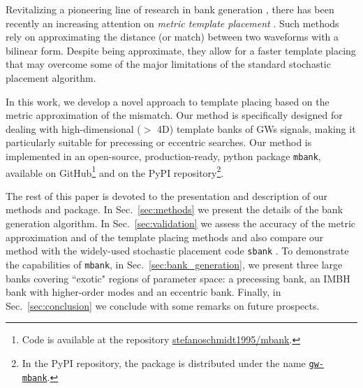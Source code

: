 \documentclass[twocolumn,showpacs,preprintnumbers,nofootinbib,prd,
superscriptaddress,10pt]{revtex4-2}
\begin{document}
Revitalizing a pioneering line of research in bank generation \cite{owen_metric, Messenger:2008ta, Prix:2007ks, Brown:2012qf, Keppel:2013uma}, there has been recently an increasing attention on {\it metric template placement} \cite{Roy:2017oul, 2018cosp...42E2899R, Coogan:2022qxs, Hanna:2022zpk}.
Such methods rely on approximating the distance (or match) between two waveforms with a bilinear form. Despite being approximate, they allow for a faster template placing that may overcome some of the major limitations of the standard stochastic placement algorithm.

In this work, we develop a novel approach to template placing based on the metric approximation of the mismatch.
Our method is specifically designed for dealing with high-dimensional ($>$ 4D) template banks of GWs signals, making it particularly suitable for precessing or eccentric searches.
Our method is implemented in an open-source, production-ready, python package \texttt{mbank}, available on GitHub\footnote{
Code is available at the repository \href{https://github.com/stefanoschmidt1995/mbank}{stefanoschmidt1995/mbank}.}
and on the PyPI repository\footnote{
In the PyPI repository, the package is distributed under the name \texttt{\href{https://pypi.org/project/gw-mbank/}{gw-mbank}}.
}.


The rest of this paper is devoted to the presentation and description of our methods and package.
In Sec.~\ref{sec:methods} we present the details of the bank generation algorithm.
In Sec.~\ref{sec:validation} we assess the accuracy of the metric approximation and of the template placing methods and also compare our method with the widely-used stochastic placement code \texttt{sbank} \cite{Ajith:2012mn}.
To demonstrate the capabilities of \texttt{mbank}, in Sec.~\ref{sec:bank_generation}, we present three large banks covering ``exotic" regions of parameter space: a precessing bank, an IMBH bank with higher-order modes and an eccentric bank.
Finally, in Sec.~\ref{sec:conclusion} we conclude with some remarks on future prospects.
\end{document}
